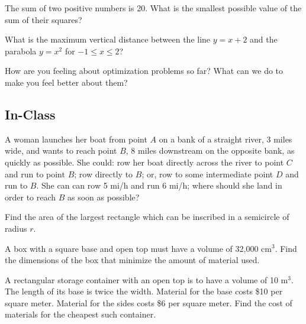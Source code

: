 \documentclass[notes]{subfiles}
\begin{document}
		\begin{ex}
			The sum of two positive numbers is 20.  What is the smallest possible value of the sum of their squares?
		\end{ex}
		
		\begin{ex}
			What is the maximum vertical distance between the line $y=x+2$ and the parabola $y=x^2$ for $-1\leq x\leq 2$?
		\end{ex}
	
		\begin{ex}
			How are you feeling about optimization problems so far?  What can we do to make you feel better about them?
		\end{ex}
			\newpage
			
	\subsection*{In-Class}
		\begin{ex}
			A woman launches her boat from point $A$ on a bank of a straight river, 3 miles wide, and wants to reach point $B$, 8 miles downstream on the opposite bank, as quickly as possible.  She could: row her boat directly across the river to point $C$ and run to point $B$; row directly to $B$; or, row to some intermediate point $D$ and run to $B$.  She can can row 5 mi/h and run 6 mi/h; where should she land in order to reach $B$ as soon as possible?
		\end{ex}
			
		\begin{ex}
			Find the area of the largest rectangle which can be inscribed in a semicircle of radius $r$.
		\end{ex}
			\newpage
			
		\begin{ex}
			A box with a square base and open top must have a volume of 32,000 cm$^3$.  Find the dimensions of the box that minimize the amount of material used.
		\end{ex}
			
		\begin{ex}
			A rectangular storage container with an open top is to have a volume of 10 m$^3$.  The length of its base is twice the width.  Material for the base costs \$10 per square meter.  Material for the sides costs \$6 per square meter.  Find the cost of materials for the cheapest such container.
		\end{ex}
			\newpage
			
\end{document}
